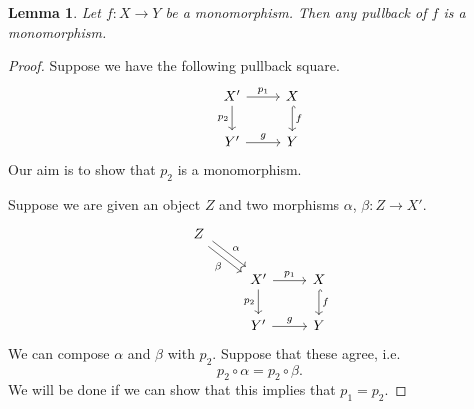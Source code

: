 \documentclass[a4paper]{report}
\theoremstyle{definition}
\theoremstyle{plain}
\newtheorem{lemma}{Lemma}[section]
\theoremstyle{remark}
\begin{document}
\begin{lemma}
  Let $f\colon X \to Y$ be a monomorphism. Then any pullback of $f$ is a monomorphism.
\end{lemma}
\begin{proof}
  Suppose we have the following pullback square.
  \begin{equation*}
    \begin{tikzcd}
      X'
      \arrow[r, "p_{1}"]
      \arrow[d, swap, "p_{2}"]
      & X
      \arrow[d, hookrightarrow, "f"]
      \\
      Y'
      \arrow[r, "g"]
      & Y
    \end{tikzcd}
  \end{equation*}
  Our aim is to show that $p_{2}$ is a monomorphism.

  Suppose we are given an object $Z$ and two morphisms $\alpha$, $\beta\colon Z \to X'$.
  \begin{equation*}
    \begin{tikzcd}
      Z
      \arrow[dr, shift left, "\alpha"]
      \arrow[dr, shift right, swap, "\beta"]
      \\
      & X'
      \arrow[r, "p_{1}"]
      \arrow[d, swap, "p_{2}"]
      & X
      \arrow[d, hookrightarrow, "f"]
      \\
      & Y'
      \arrow[r, "g"]
      & Y
    \end{tikzcd}
  \end{equation*}
  We can compose $\alpha$ and $\beta$ with $p_{2}$. Suppose that these agree, i.e.
  \begin{equation*}
    p_{2} \circ \alpha = p_{2} \circ \beta.
  \end{equation*}
  We will be done if we can show that this implies that $p_{1} = p_{2}$.


\end{proof}
\end{document}
